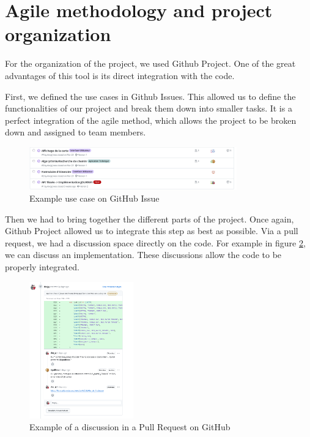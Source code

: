\section{Agile methodology and project organization}

For the organization of the project, we used Github Project.
One of the great advantages of this tool is its direct integration with the code.

First, we defined the use cases in Github Issues.
This allowed us to define the functionalities of our project and break them down into smaller tasks.
It is a perfect integration of the agile method, which allows the project to be broken down and assigned to team members.

\begin{figure}[h]
    \centering
    \includegraphics[width=0.8\textwidth]{img/GitHubUseCase}
    \caption{Example use case on GitHub Issue}
    \label{fig:GitHubUseCase}
\end{figure}

Then we had to bring together the different parts of the project.
Once again, Github Project allowed us to integrate this step as best as possible.
Via a pull request, we had a discussion space directly on the code.
For example in figure \ref{fig:GitHubPullRequest}, we can discuss an implementation.
These discussions allow the code to be properly integrated.

\begin{figure}[h]
    \centering
    \includegraphics[width=0.4\textwidth]{img/GitHubDiscuss}
    \caption{Example of a discussion in a Pull Request on GitHub}
    \label{fig:GitHubPullRequest}
\end{figure}

